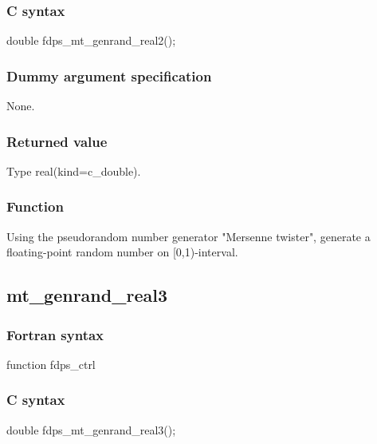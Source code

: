 \subsubsection*{C syntax}
\begin{screen}
\begin{spverbatim}
double fdps_mt_genrand_real2();
\end{spverbatim}
\end{screen}

\subsubsection*{Dummy argument specification}
None.

\subsubsection*{Returned value}
Type real(kind=c\_double).

\subsubsection*{Function}
Using the pseudorandom number generator "Mersenne twister", generate a floating-point random number on [0,1)-interval.
\clearpage

\subsection{mt\_genrand\_real3}
\subsubsection*{Fortran syntax}
\begin{screen}
\begin{spverbatim}
function fdps_ctrl%
\end{spverbatim}
\end{screen}

\subsubsection*{C syntax}
\begin{screen}
\begin{spverbatim}
double fdps_mt_genrand_real3();
\end{spverbatim}
\end{screen}

